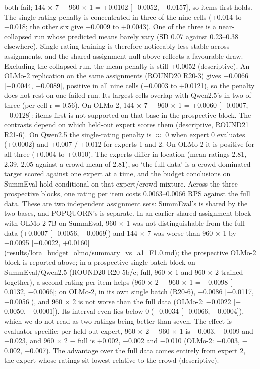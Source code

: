 \documentclass[10pt,twocolumn]{article}
\begin{document}
both fail; 144 $\times$ 7 $-$ 960 $\times$ 1 = +0.0102 {[}+0.0052, +0.0157{]}, so items-first holds. The single-rating penalty is concentrated in three of the nine cells (+0.014 to +0.018; the other six give $-$0.0009 to +0.0043). One of the three is a near-collapsed run whose predicted means barely vary (SD 0.07 against 0.23--0.38 elsewhere). Single-rating training is therefore noticeably less stable across assignments, and the shared-assignment null above reflects a favourable draw. Excluding the collapsed run, the mean penalty is still +0.0052 (descriptive). An OLMo-2 replication on the same assignments (ROUND20 R20-3) gives +0.0066 {[}+0.0044, +0.0089{]}, positive in all nine cells (+0.0003 to +0.0121), so the penalty does not rest on one failed run. Its largest cells overlap with Qwen2.5's in two of three (per-cell r = 0.56). On OLMo-2, 144 $\times$ 7 $-$ 960 $\times$ 1 = +0.0060 {[}$-$0.0007, +0.0128{]}: items-first is not supported on that base in the prospective block. The contrasts depend on which held-out expert scores them (descriptive, ROUND21 R21-6). On Qwen2.5 the single-rating penalty is $\approx$ 0 when expert 0 evaluates (+0.0002) and +0.007 / +0.012 for experts 1 and 2. On OLMo-2 it is positive for all three (+0.004 to +0.010). The experts differ in location (mean ratings 2.81, 2.39, 2.05 against a crowd mean of 2.81), so `the full data' is a crowd-dominated target scored against one expert at a time, and the budget conclusions on SummEval hold conditional on that expert/crowd mixture. Across the three prospective blocks, one rating per item costs 0.0063--0.0066 RPS against the full data. These are two independent assignment sets: SummEval's is shared by the two bases, and POPQUORN's is separate. In an earlier shared-assignment block with OLMo-2-7B on SummEval, 960 $\times$ 1 was not distinguishable from the full data (+0.0007 {[}$-$0.0056, +0.0069{]}) and 144 $\times$ 7 was worse than 960 $\times$ 1 by +0.0095 {[}+0.0022, +0.0160{]} (results/lora\_budget\_olmo/summary\_vs\_a1\_F1.0.md); the prospective OLMo-2 block is reported above; in a prospective single-batch block on SummEval/Qwen2.5 (ROUND20 R20-5b/c; full, 960 $\times$ 1 and 960 $\times$ 2 trained together), a second rating per item helps (960 $\times$ 2 $-$ 960 $\times$ 1 = $-$0.0098 {[}$-$0.0132, $-$0.0066{]}; on OLMo-2, in its own single batch (R20-6), $-$0.0086 {[}$-$0.0117, $-$0.0056{]}), and 960 $\times$ 2 is not worse than the full data (OLMo-2: $-$0.0022 {[}$-$0.0050, $-$0.0001{]}). Its interval even lies below 0 ($-$0.0034 {[}$-$0.0066, $-$0.0004{]}), which we do not read as two ratings being better than seven. The effect is evaluator-specific: per held-out expert, 960 $\times$ 2 $-$ 960 $\times$ 1 is +0.003, $-$0.009 and $-$0.023, and 960 $\times$ 2 $-$ full is +0.002, $-$0.002 and $-$0.010 (OLMo-2: +0.003, $-$0.002, $-$0.007). The advantage over the full data comes entirely from expert 2, the expert whose ratings sit lowest relative to the crowd (descriptive).
\end{document}
